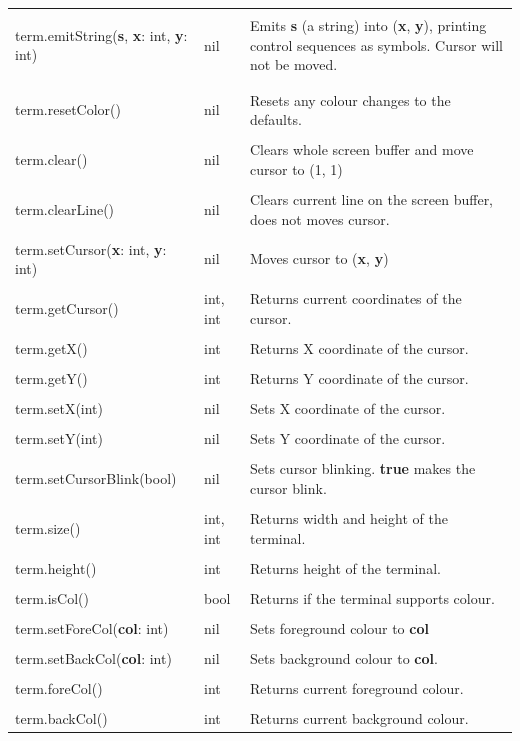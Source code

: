 \begin{tabularx}{\textwidth}{l l X}
	\\ \\
	term.emitString(\textbf{s}, \textbf{x}: int, \textbf{y}: int) & nil & Emits \textbf{s} (a string) into (\textbf{x}, \textbf{y}), printing control sequences as symbols. Cursor will not be moved.
	\\ \\
	\begin{tabular}[t]{@{}l@{}}term.resetColour()\\term.resetColor()\end{tabular} & nil & Resets any colour changes to the defaults.
	\\ \\
	term.clear() & nil & Clears whole screen buffer and move cursor to (1, 1)
	\\ \\
	term.clearLine() & nil & Clears current line on the screen buffer, does not moves cursor.
	\\ \\
	term.setCursor(\textbf{x}: int, \textbf{y}: int) & nil & Moves cursor to (\textbf{x}, \textbf{y})
	\\ \\
	term.getCursor() & int, int & Returns current coordinates of the cursor.
	\\ \\
	term.getX() & int & Returns X coordinate of the cursor.
	\\ \\
	term.getY() & int & Returns Y coordinate of the cursor.
	\\ \\
	term.setX(int) & nil & Sets X coordinate of the cursor.
	\\ \\
	term.setY(int) & nil & Sets Y coordinate of the cursor.
	\\ \\
	term.setCursorBlink(bool) & nil & Sets cursor blinking. \textbf{true} makes the cursor blink.
	\\ \\
	term.size() & int, int & Returns width and height of the terminal.
	\\ \\
	term.height() & int & Returns height of the terminal. 
	\\ \\
	term.isCol() & bool & Returns if the terminal supports colour.
	\\ \\
	term.setForeCol(\textbf{col}: int) & nil & Sets foreground colour to \textbf{col}
	\\ \\
	term.setBackCol(\textbf{col}: int) & nil & Sets background colour to \textbf{col}.
	\\ \\
	term.foreCol() & int & Returns current foreground colour.
	\\ \\
	term.backCol() & int & Returns current background colour.
\end{tabularx}

